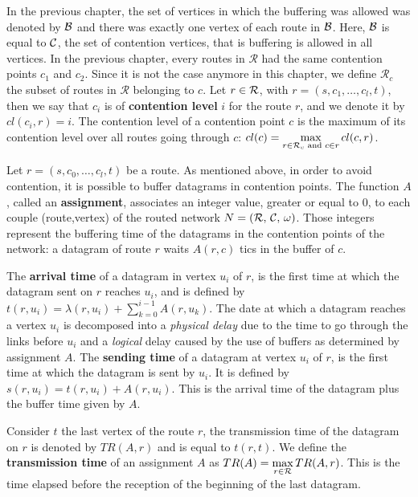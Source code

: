 In the previous chapter, the set of vertices in which the buffering was allowed was denoted by ${\cal B}$ and there was exactly one vertex of each route in ${\cal B}$. Here, ${\cal B}$ is equal to ${\cal C}$, the set of contention vertices, that is buffering is allowed in all vertices. 
In the previous chapter, every routes in $\mathcal{R}$ had the same contention points $c_1$ and $c_2$. Since it is not the case anymore in this chapter, we define $\mathcal{R}_c$ the subset of routes in $\mathcal{R}$ belonging to $c$. Let $r \in {\cal R}$, with $r = (s,c_1,\dots,c_l,t)$, then we say that $c_i$ is of \textbf{contention level} $i$ for the route $r$, and we denote it by $cl(c_i,r) = i$. The contention level of a contention point $c$ is the maximum of its contention level over all routes going through $c$: $cl(c) = \max\limits_{r\in{\cal R}_c \text{ and } c \in r} cl(c,r)$.


   Let $r=(s,c_0,\dots,c_l,t)$ be a route. As mentioned above, in order to avoid contention, it is possible to buffer datagrams in contention points. The function $A$, called an \textbf{assignment}, associates an integer value, greater or equal to $0$, to each couple (route,vertex) of the routed network $N = ({\cal R},\,{\cal C},\,\omega)$. Those integers represent the buffering time of the datagrams in the contention points of the network: a datagram of route $r$ waits $A(r,c)$ tics in the buffer of $c$.
          
       

 The \textbf{arrival time} of a datagram in vertex $u_i$ of $r$, is the first time at which the datagram sent on $r$ reaches $u_i$, and is defined by $t(r,u_i) = \lambda(r,u_i) + \sum_{k=0}^{i-1} A(r,u_k) $. The date at which a datagram reaches a vertex $u_i$ is decomposed into a \emph{physical delay} due to the time to go through the links before $u_i$ and a \emph{logical} delay caused by the use of buffers as determined by assignment $A$.
  The \textbf{sending time} of a datagram at vertex $u_i$ of $r$, is the first time at which the datagram is sent by $u_i$. It is defined by $s(r,u_i) = t(r,u_i) +  A(r,u_i) $. This is the arrival time of the datagram plus the buffer time given by $A$.
 
  Consider $t$ the last vertex of the route $r$, the transmission time of the datagram on 
  $r$ is denoted by $TR(A,r)$ and is equal to $t(r,t)$. We define the \textbf{transmission time} of an assignment $A$ as $TR(A) = \displaystyle \max\limits_{r \in {\cal R}} TR(A,r) $. This is the time elapsed before the reception of the beginning of the last datagram. 

